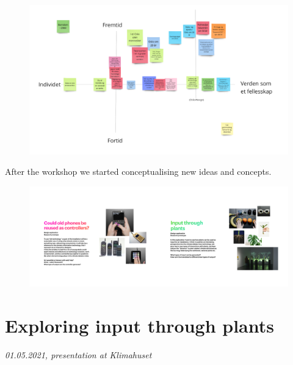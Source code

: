 \begin{figure}[H]
\includegraphics[width=12.5cm]{pictures/process/workshop_results.png}
\caption{}
\centering 
\end{figure}


After the workshop we started conceptualising new ideas and concepts.

\begin{figure}[H]
\includegraphics[width=13cm]{pictures/process/mini_pitches.png}
\centering 
\end{figure}



\section{Exploring input through plants}
\par
\emph{01.05.2021, presentation at Klimahuset}
\par

